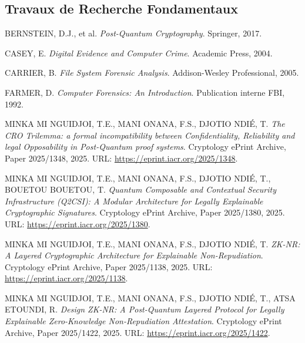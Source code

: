\documentclass[11pt,a4paper,oneside]{book}
\begin{document}
    \begin{thebibliography}{99}
      \section*{Travaux de Recherche Fondamentaux}

        BERNSTEIN, D.J., et al.
        \textit{Post-Quantum Cryptography}.
        Springer, 2017.

        CASEY, E.
        \emph{Digital Evidence and Computer Crime}.
        Academic Press, 2004.

        CARRIER, B.
        \emph{File System Forensic Analysis}.
        Addison-Wesley Professional, 2005.

        FARMER, D.
        \emph{Computer Forensics: An Introduction}.
        Publication interne FBI, 1992.

        MINKA MI NGUIDJOI, T.E., MANI ONANA, F.S., DJOTIO NDIÉ, T. 
        \emph{The CRO Trilemma: a formal incompatibility between Confidentiality, Reliability and legal Opposability in Post-Quantum proof systems}. 
        Cryptology ePrint Archive, Paper 2025/1348, 2025. 
        URL: \url{https://eprint.iacr.org/2025/1348}.

        MINKA MI NGUIDJOI, T.E., MANI ONANA, F.S., DJOTIO NDIÉ, T., BOUETOU BOUETOU, T.
        \emph{Quantum Composable and Contextual Security Infrastructure (Q2CSI): A Modular Architecture for Legally Explainable Cryptographic Signatures}.
        Cryptology ePrint Archive, Paper 2025/1380, 2025.
        URL: \url{https://eprint.iacr.org/2025/1380}.

        MINKA MI NGUIDJOI, T.E., MANI ONANA, F.S., DJOTIO NDIÉ, T.
        \emph{ZK-NR: A Layered Cryptographic Architecture for Explainable Non-Repudiation}.
        Cryptology ePrint Archive, Paper 2025/1138, 2025.
        URL: \url{https://eprint.iacr.org/2025/1138}.

        MINKA MI NGUIDJOI, T.E., MANI ONANA, F.S., DJOTIO NDIÉ, T., ATSA ETOUNDI, R.
        \emph{Design ZK-NR: A Post-Quantum Layered Protocol for Legally Explainable Zero-Knowledge Non-Repudiation Attestation}.
        Cryptology ePrint Archive, Paper 2025/1422, 2025.
        URL: \url{https://eprint.iacr.org/2025/1422}.


\end{thebibliography}
\end{document}
